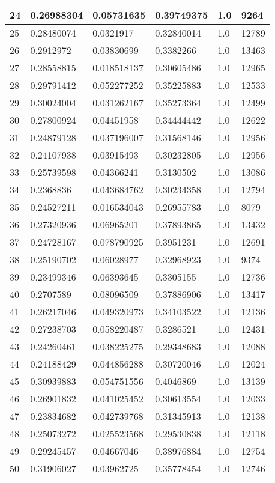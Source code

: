 \begin{longtable}{|l|l|l|l|l|l|}
24 & 0.26988304 & 0.05731635 & 0.39749375 & 1.0 & 9264 \\ \hline 
25 & 0.28480074 & 0.0321917 & 0.32840014 & 1.0 & 12789 \\ \hline 
26 & 0.2912972 & 0.03830699 & 0.3382266 & 1.0 & 13463 \\ \hline 
27 & 0.28558815 & 0.018518137 & 0.30605486 & 1.0 & 12965 \\ \hline 
28 & 0.29791412 & 0.052277252 & 0.35225883 & 1.0 & 12533 \\ \hline 
29 & 0.30024004 & 0.031262167 & 0.35273364 & 1.0 & 12499 \\ \hline 
30 & 0.27800924 & 0.04451958 & 0.34444442 & 1.0 & 12622 \\ \hline 
31 & 0.24879128 & 0.037196007 & 0.31568146 & 1.0 & 12956 \\ \hline 
32 & 0.24107938 & 0.03915493 & 0.30232805 & 1.0 & 12956 \\ \hline 
33 & 0.25739598 & 0.04366241 & 0.3130502 & 1.0 & 13086 \\ \hline 
34 & 0.2368836 & 0.043684762 & 0.30234358 & 1.0 & 12794 \\ \hline 
35 & 0.24527211 & 0.016534043 & 0.26955783 & 1.0 & 8079 \\ \hline 
36 & 0.27320936 & 0.06965201 & 0.37893865 & 1.0 & 13432 \\ \hline 
37 & 0.24728167 & 0.078790925 & 0.3951231 & 1.0 & 12691 \\ \hline 
38 & 0.25190702 & 0.06028977 & 0.32968923 & 1.0 & 9374 \\ \hline 
39 & 0.23499346 & 0.06393645 & 0.3305155 & 1.0 & 12736 \\ \hline 
40 & 0.2707589 & 0.08096509 & 0.37886906 & 1.0 & 13417 \\ \hline 
41 & 0.26217046 & 0.049320973 & 0.34103522 & 1.0 & 12136 \\ \hline 
42 & 0.27238703 & 0.058220487 & 0.3286521 & 1.0 & 12431 \\ \hline 
43 & 0.24260461 & 0.038225275 & 0.29348683 & 1.0 & 12088 \\ \hline 
44 & 0.24188429 & 0.044856288 & 0.30720046 & 1.0 & 12024 \\ \hline 
45 & 0.30939883 & 0.054751556 & 0.4046869 & 1.0 & 13139 \\ \hline 
46 & 0.26901832 & 0.041025452 & 0.30613554 & 1.0 & 12033 \\ \hline 
47 & 0.23834682 & 0.042739768 & 0.31345913 & 1.0 & 12138 \\ \hline 
48 & 0.25073272 & 0.025523568 & 0.29530838 & 1.0 & 12118 \\ \hline 
49 & 0.29245457 & 0.04667046 & 0.38976884 & 1.0 & 12754 \\ \hline 
50 & 0.31906027 & 0.03962725 & 0.35778454 & 1.0 & 12746 \\ \hline 
\end{longtable}